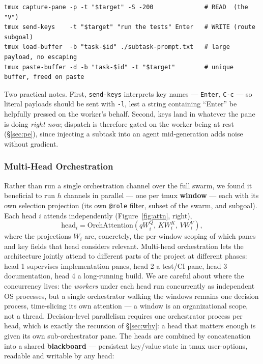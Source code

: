 \documentclass[10pt]{article}
\newcommand{\code}[1]{\texttt{\small #1}}
\begin{document}
\begin{lstlisting}
tmux capture-pane -p -t "$target" -S -200              # READ  (the "V")
tmux send-keys    -t "$target" "run the tests" Enter   # WRITE (route subgoal)
tmux load-buffer  -b "task-$id" ./subtask-prompt.txt   # large payload, no escaping
tmux paste-buffer -d -b "task-$id" -t "$target"        # unique buffer, freed on paste
\end{lstlisting}

Two practical notes. First, \code{send-keys} interprets key names --- \code{Enter},
\code{C-c} --- so literal payloads should be sent with \code{-l}, lest a string
containing ``Enter'' be helpfully pressed on the worker's behalf. Second, keys land
in whatever the pane is doing \emph{right now}; dispatch is therefore gated on the
worker being at rest (\S\ref{sec:pe}), since injecting a subtask into an agent
mid-generation adds noise without gradient.

\subsubsection{Multi-Head Orchestration}\label{sec:mha}

Rather than run a single orchestration channel over the full swarm, we found it
beneficial to run $h$ channels in parallel --- one per tmux \textbf{window} --- each
with its own selection projection (its own \code{@role} filter, subset of the swarm,
and subgoal). Each head $i$ attends independently (Figure~\ref{fig:attn}, right),
\begin{equation}
\mathrm{head}_i = \mathrm{OrchAttention}\!\left(qW_i^{Q},\, KW_i^{K},\, VW_i^{V}\right),
\end{equation}
where the projections $W_i$ are, concretely, the per-window scoping of which panes and
key fields that head considers relevant. Multi-head orchestration lets the
architecture jointly attend to different parts of the project at different phases:
head 1 supervises implementation panes, head 2 a test/CI pane, head 3 documentation,
head 4 a long-running build. We are careful about where the concurrency lives: the
\emph{workers} under each head run concurrently as independent OS processes, but a
single orchestrator walking the windows remains one decision process, time-slicing
its own attention --- a window is an organizational scope, not a thread.
Decision-level parallelism requires one orchestrator process per head, which is
exactly the recursion of \S\ref{sec:why}: a head that matters enough is given its
own sub-orchestrator pane. The heads are
combined by concatenation into a shared \textbf{blackboard} --- persistent key/value
state in tmux user-options, readable and writable by any head:
\end{document}
